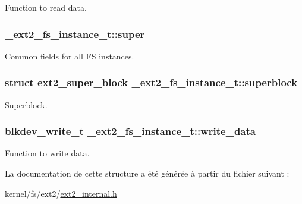 Function to read data. \hypertarget{struct__ext2__fs__instance__t_a456ee695fb1a0b71edadda9f4504ca2d}{
\subsubsection[{super}]{ \-\_\-ext2\-\_\-fs\-\_\-instance\-\_\-t\-::super}}\label{struct__ext2__fs__instance__t_a456ee695fb1a0b71edadda9f4504ca2d}
Common fields for all F\-S instances. \hypertarget{struct__ext2__fs__instance__t_a81ad8719743e20da6f661c2586b56ad2}{
\subsubsection[{superblock}]{\setlength{\rightskip}{0pt plus 5cm}struct {\bf ext2\-\_\-super\-\_\-block} \-\_\-ext2\-\_\-fs\-\_\-instance\-\_\-t\-::superblock}}\label{struct__ext2__fs__instance__t_a81ad8719743e20da6f661c2586b56ad2}
Superblock. \hypertarget{struct__ext2__fs__instance__t_a90d334c34e9aeea01be13fe1ed66ba7b}{
\subsubsection[{write\-\_\-data}]{\setlength{\rightskip}{0pt plus 5cm}blkdev\-\_\-write\-\_\-t \-\_\-ext2\-\_\-fs\-\_\-instance\-\_\-t\-::write\-\_\-data}}\label{struct__ext2__fs__instance__t_a90d334c34e9aeea01be13fe1ed66ba7b}
Function to write data. 

La documentation de cette structure a été générée à partir du fichier suivant \-:\begin{DoxyCompactItemize}
\item 
kernel/fs/ext2/\hyperlink{ext2__internal_8h}{ext2\-\_\-internal.\-h}\end{DoxyCompactItemize}
